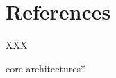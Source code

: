 %
%
%
%
%
%

%
%

\chapter{References}
\label{chapter:references}

XXX

\newpage

%
%

core
architectures*
